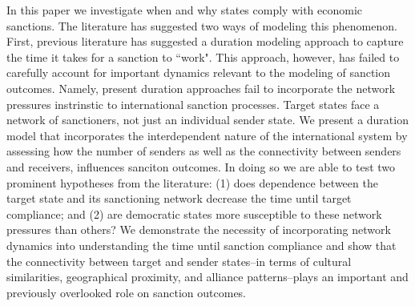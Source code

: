 In this paper we investigate when and why states comply with economic sanctions.  The literature has suggested two ways of modeling this phenomenon. First, previous literature has suggested a duration modeling approach to capture the time it takes for a sanction to ``work". This approach, however, has failed to carefully account for important dynamics relevant to the modeling of sanction outcomes. Namely, present duration approaches fail to incorporate the network pressures instrinstic to international sanction processes. Target states face a network of sanctioners, not just an individual sender state. We present a duration model that incorporates the interdependent nature of the international system by assessing how the number of senders as well as the connectivity between senders and receivers, influences sanciton outcomes. In doing so we are able to test two prominent hypotheses from the literature: (1) does dependence between the target state and its sanctioning network decrease the time until target compliance; and (2) are democratic states more susceptible to these network pressures than others? We demonstrate the necessity of incorporating network dynamics into understanding the time until sanction compliance and show that the connectivity between target and sender states--in terms of cultural similarities, geographical proximity, and alliance patterns--plays an important and previously overlooked role on sanction outcomes.